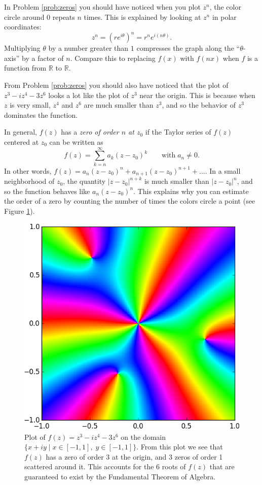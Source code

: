 In Problem \ref{prob:zeros} you should have noticed when you plot $z^n$, the color circle around 0 repeats $n$ times. 
This is explained by looking at $z^n$ in polar coordinates:
\[
z^n = (re^{i \theta})^n = r^n e^{i(n\theta)}.
\]
Multiplying $\theta$ by a number greater than $1$ compresses the graph along the ``$\theta$-axis'' by a factor of $n$. 
Compare this to replacing $f(x)$ with $f(nx)$ when $f$ is a function from $\mathbb{R}$ to $\mathbb{R}$.

From Problem \ref{prob:zeros} you should also have noticed that the plot of $z^3 - iz^4 - 3z^6$ looks a lot like the plot of $z^3$ near the origin.
This is because when $z$ is very small, $z^4$ and $z^6$ are much smaller than $z^3$, and so the behavior of $z^3$ dominates the function.

In general, $f(z)$ has a \emph{zero of order $n$ at $z_0$} if the Taylor series of $f(z)$ centered at $z_0$ can be written as 
\[
f(z) = \sum_{k=n}^{\infty} a_k(z-z_0)^k \qquad \text{with} \; a_n \neq 0.
\]
In other words, $f(z) = a_n(z-z_0)^n + a_{n+1}(z-z_0)^{n+1} + \ldots$. 
In a small neighborhood of $z_0$, the quantity $|z-z_0|^{n+k}$ is much smaller than $|z-z_0|^n$, and so the function behaves like $a_n(z-z_0)^n$.
This explains why you can estimate the order of a zero by counting the number of times the colors circle a point (see Figure \ref{fig:zeros}).

\begin{figure}
\includegraphics[width=.7\textwidth]{zeros.png}
\caption{Plot of $f(z)=z^3 - iz^4 - 3z^6$ on the domain $\{x+iy \mid x \in [-1,1] , \; y \in [-1,1]\}$.
From this plot we see that $f(z)$ has a zero of order 3 at the origin, and 3 zeros of order 1 scattered around it. 
This accounts for the 6 roots of $f(z)$ that are guaranteed to exist by the Fundamental Theorem of Algebra.}
\label{fig:zeros}
\end{figure}


